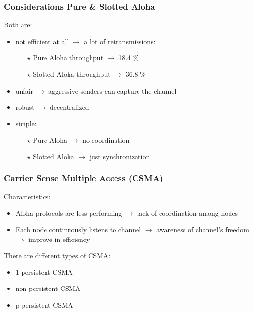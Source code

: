 \subsubsection{Considerations Pure \& Slotted Aloha}
Both are:
\begin{itemize}
    \item not efficient at all $\rightarrow$ a lot of retransmissions:
    \begin{itemize}
        \item[$\star$] Pure Aloha throughput $\rightarrow$ 18.4 \%
        \item[$\star$] Slotted Aloha throughput $\rightarrow$ 36.8 \%
    \end{itemize}
    \item unfair $\rightarrow$ aggressive senders can capture the channel
    \item robust $\rightarrow$ decentralized
    \item simple:
    \begin{itemize}
        \item[$\star$] Pure Aloha $\rightarrow$ no coordination
        \item[$\star$] Slotted Aloha $\rightarrow$ just synchronization
    \end{itemize}
\end{itemize}
\subsubsection{Carrier Sense Multiple Access (CSMA)}
Characteristics:
\begin{itemize}
    \item Aloha protocols are less performing $\rightarrow$ lack of coordination among nodes
    \item Each node continuously listens to channel $\rightarrow$ awareness of channel's freedom
    $\Rightarrow$ improve in efficiency
\end{itemize}
There are different types of CSMA:
\begin{itemize}
    \item 1-persistent CSMA
    \item non-persistent CSMA
    \item p-persistent CSMA
\end{itemize}

